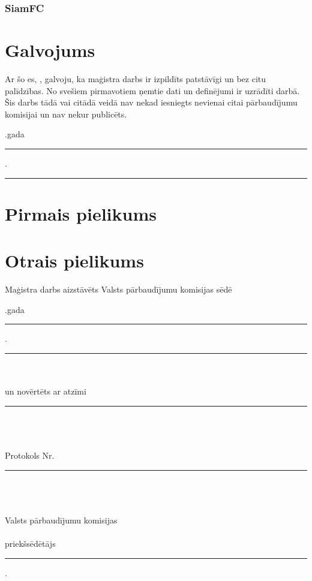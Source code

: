 \documentclass[12pt,paper=a4]{report}
\newcounter{nofappendices}
\begin{document}
\subsection{SiamFC}




\chapter*{Galvojums}
 Ar šo es, , galvoju, ka maģistra darbs ir izpildīts patstāvīgi un bez citu palīdzības. No svešiem pirmavotiem ņemtie dati un definējumi ir uzrādīti darbā. Šis darbs tādā vai citādā veidā nav nekad iesniegts nevienai citai pārbaudījumu komisijai un nav nekur publicēts.

\vspace{1in}
.gada \rule{1cm}{0.2pt}.\rule{3cm}{0.2pt}
\label{LastPage}

\appendix
\chapter{Pirmais pielikums}

\addtocounter{nofappendices}{1}
\label{appendix:tituldati}
%


\chapter{Otrais pielikums}

\addtocounter{nofappendices}{1}
\label{appendix:tituldati2}


\pagebreak
\pagestyle{empty}
\begin{center}
 Maģistra darbs aizstāvēts Valsts pārbaudījumu komisijas sēdē\\
 \vspace{1em}
\end{center}
.gada \rule{1cm}{0.2pt} . \rule{3cm}{0.2pt}\\\\
un novērtēts ar atzīmi \rule{4cm}{0.2pt} \\\\\\
Protokols Nr. \rule{1cm}{0.2pt}\\\\\\
Valsts pārbaudījumu komisijas \\\\
priekšsēdētājs \rule{7cm}{0.2pt}.\\
\hspace*{5cm}\textit{}
\end{document}
